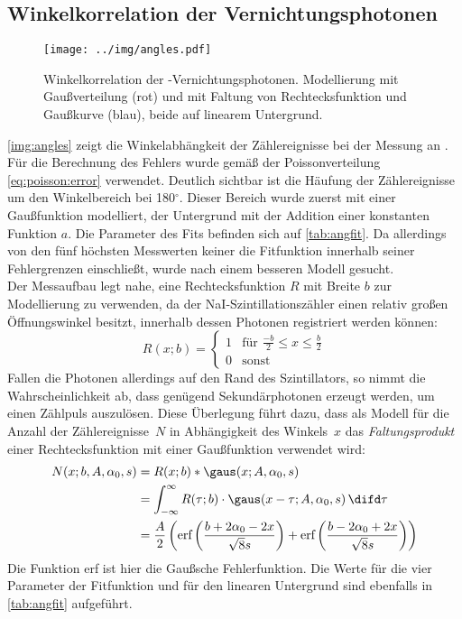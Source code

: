 \subsection{Winkelkorrelation der  Vernichtungsphotonen}
\begin{figure}[H]
\begin{center}
  \texttt{[image: ../img/angles.pdf]}
  \caption{Winkelkorrelation der \na-Vernichtungsphotonen.
  Modellierung mit Gaußverteilung (rot) und
  mit Faltung von Rechtecksfunktion und Gaußkurve (blau), beide auf linearem Untergrund.}
  \label{img:angles}
\end{center}
\end{figure}

\autoref{img:angles} zeigt die Winkelabhängkeit der Zählereignisse bei der Messung an \na.
Für die Berechnung des Fehlers wurde gemäß der Poissonverteilung \autoref{eq:poisson:error} verwendet.
Deutlich sichtbar ist die Häufung der Zählereignisse um den Winkelbereich bei 180$^\circ$.
Dieser Bereich wurde zuerst mit einer Gaußfunktion modelliert,
der Untergrund mit der Addition einer konstanten Funktion $a$.
Die Parameter des Fits befinden sich auf \autoref{tab:angfit}.
Da allerdings von den fünf höchsten Messwerten keiner die Fitfunktion innerhalb seiner Fehlergrenzen einschließt,
wurde nach einem besseren Modell gesucht.\\
Der Messaufbau legt nahe, eine Rechtecksfunktion $R$ mit Breite $b$ zur Modellierung zu verwenden,
da der NaI-Szintillationszähler einen relativ großen Öffnungswinkel besitzt,
innerhalb dessen Photonen registriert werden können:
\begin{equation}
  R(x;b) =
\begin{cases}
1 & \text{für }\frac{-b}{2} \leq x \leq \frac{b}{2}\\
0 & \text{sonst}
\end{cases}
\end{equation}
Fallen die Photonen allerdings auf den Rand des Szintillators,
so nimmt die Wahrscheinlichkeit ab, dass genügend Sekundärphotonen erzeugt werden,
um einen Zählpuls auszulösen.
Diese Überlegung führt dazu, dass als Modell für die Anzahl der Zählereignisse~$N$ in Abhängigkeit des Winkels~$x$
das \emph{Faltungsprodukt} einer Rechtecksfunktion mit einer
Gaußfunktion verwendet wird:
\begin{equation}
\begin{split}
  N(x;b,A,\alpha_0,s)&=R(x;b)*\gaus(x;A,\alpha_0,s)\\
  & = \int_{-\infty}^{\infty}{R(\tau;b) \cdot  \gaus(x-\tau;A,\alpha_0,s) \, \difd\tau}\\
  & =   \frac{A}{2} \left(\text{erf}\left(\frac{b+2 \alpha_0 -2 x}{\sqrt{8} s }\right)+
  \text{erf}\left(\frac{b-2 \alpha_0 +2 x}{\sqrt{8} s }\right)\right)
\end{split}
\end{equation}
Die Funktion erf ist hier die Gaußsche Fehlerfunktion.
Die Werte für die vier Parameter der Fitfunktion und für den linearen Untergrund sind ebenfalls
in \autoref{tab:angfit} aufgeführt.

